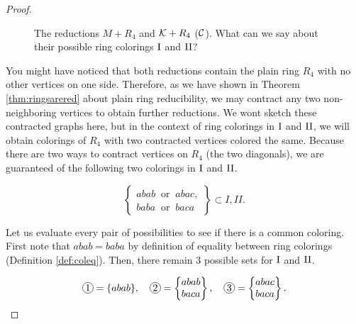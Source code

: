 \begin{proof}
\begin{figure}[!ht]
    \caption{The reductions $M+R_4$ and $\mathcal{K}+R_4$ ($\mathcal{C}$). What can we say about their possible ring colorings $\text{I}$ and $\text{II}$?}
    \label{fig:ring4tut}
\end{figure}

You might have noticed that both reductions contain the plain ring $R_4$ with no other vertices on one side. Therefore, as we have shown in Theorem \ref{thm:ringsarered} about plain ring reducibility, we may contract any two non-neighboring vertices to obtain further reductions. We wont sketch these contracted graphs here, but in the context of ring colorings in $\text{I}$ and $\text{II}$, we will obtain colorings of $R_4$ with two contracted vertices colored the same. Because there are two ways to contract vertices on $R_4$ (the two diagonals), we are guaranteed of the following two colorings in $\text{I}$ and $\text{II}$.

\begin{equation}
    \left\{\begin{matrix}
        abab \;\;\text{or}\;\; abac, \\
        baba \;\;\text{or}\;\; baca
    \end{matrix}\right\} \subset I,II.
\end{equation}

Let us evaluate every pair of possibilities to see if there is a common coloring. First note that $abab=baba$ by definition of equality between ring colorings (Definition \ref{def:coleq}). Then, there remain 3 possible sets for $\text{I}$ and $\text{II}$.

\needspace{2cm}
\begin{equation}
    \circled{1} = \{ abab \}, \quad \circled{2} = \left\{ \begin{matrix}abab \\ baca\end{matrix} \right\}, \quad \circled{3} = \left\{ \begin{matrix}abac \\ baca \end{matrix} \right\}.
\end{equation}


\end{proof}

